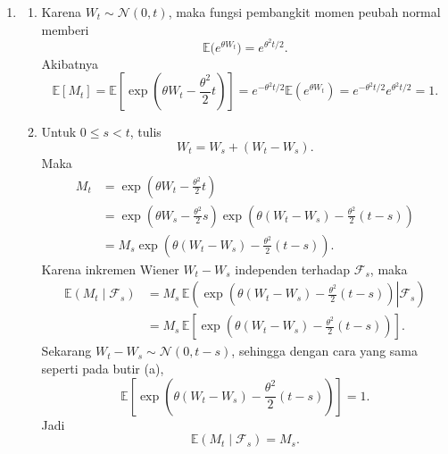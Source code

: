 \documentclass[11pt,a4paper]{article}
\newcommand{\E}{\mathbb{E}}
\newcommand{\F}{\mathcal{F}}
\begin{document}
\begin{enumerate}[leftmargin=*, itemsep=0.6cm]
  \item \begin{enumerate}[label=\alph*)]
          \item Karena $W_t\sim\mathcal{N}(0,t)$, maka fungsi pembangkit momen peubah normal
                memberi
                \[
                  \E\bigl(e^{\theta W_t}\bigr)=e^{\theta^2 t/2}.
                \]
                Akibatnya
                \[
                  \E[M_t]
                  =\E\left[\exp\left(\theta W_t-\frac{\theta^2}{2}t\right)\right]
                  =e^{-\theta^2 t/2}\E(e^{\theta W_t})
                  =e^{-\theta^2 t/2}e^{\theta^2 t/2}
                  =1.
                \]

          \item Untuk $0\le s<t$, tulis
                \[
                  W_t=W_s+(W_t-W_s).
                \]
                Maka
                \begin{align*}
                  M_t
                   & =\exp\left(\theta W_t-\frac{\theta^2}{2}t\right)\\
                   & =\exp\left(\theta W_s-\frac{\theta^2}{2}s\right)
                  \exp\left(\theta(W_t-W_s)-\frac{\theta^2}{2}(t-s)\right)\\
                   & =M_s\exp\left(\theta(W_t-W_s)-\frac{\theta^2}{2}(t-s)\right).
                \end{align*}
                Karena inkremen Wiener $W_t-W_s$ independen terhadap $\F_s$, maka
                \begin{align*}
                  \E(M_t\mid\F_s)
                   & =M_s\,
                  \E\left(
                  \left.
                  \exp\left(\theta(W_t-W_s)-\frac{\theta^2}{2}(t-s)\right)
                  \right|\F_s
                  \right)\\
                   & =M_s\,
                  \E\left[
                  \exp\left(\theta(W_t-W_s)-\frac{\theta^2}{2}(t-s)\right)
                  \right].
                \end{align*}
                Sekarang $W_t-W_s\sim\mathcal{N}(0,t-s)$, sehingga dengan cara yang sama
                seperti pada butir (a),
                \[
                  \E\left[
                  \exp\left(\theta(W_t-W_s)-\frac{\theta^2}{2}(t-s)\right)
                  \right]
                  =1.
                \]
                Jadi
                \[
                  \E(M_t\mid\F_s)=M_s.
                \]


\end{enumerate}
\end{enumerate}
\end{document}
